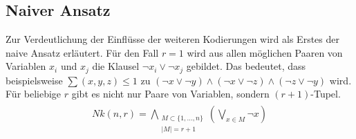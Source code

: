 \documentclass[a4,abstract=on]{scrartcl}
\begin{document}

	\subsection{Naiver Ansatz}
Zur Verdeutlichung der Einflüsse der weiteren Kodierungen wird als Erstes der naive Ansatz \cite[vgl.][]{sinz} erläutert. Für den Fall $r=1$ wird aus allen möglichen Paaren von Variablen $x_i$ und $x_j$ die Klausel $\neg x_i \vee \neg x_j$ gebildet. Das bedeutet, dass beispielsweise $\sum(x,y,z)\leq1$ zu $(\neg x \vee \neg y) \wedge (\neg x \vee \neg z) \wedge (\neg z \vee \neg y)$ wird.
Für beliebige $r$ gibt es nicht nur Paare von Variablen, sondern $(r+1)$-Tupel.\\
\begin{align*}
\begin{aligned}
Nk (n, r) = \bigwedge_{\substack{M\subset \{1, \dots, n\} \\  |M|=r+1}} (\bigvee_{x \in M} {\neg x})
\end{aligned}
\end{align*}

\end{document}
